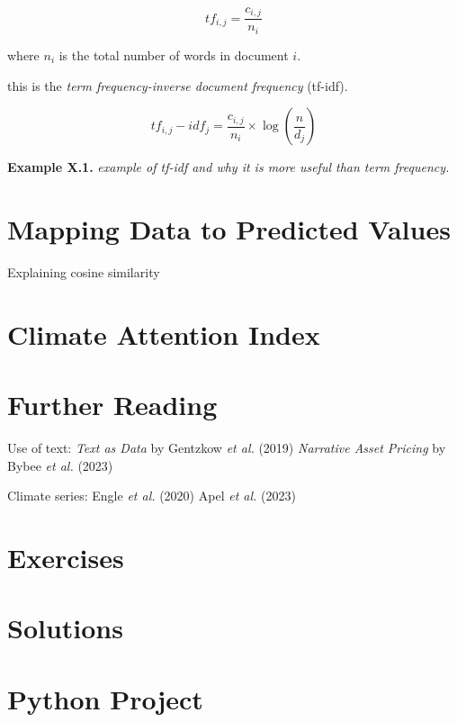 \begin{equation}
tf_{i,j} = \frac{c_{i,j}}{n_i}
\end{equation}

where $n_i$ is the total number of words in document $i$.



this is the \textit{term frequency-inverse document frequency} (tf-idf).

\begin{equation}
tf_{i,j} - idf_{j} = \frac{c_{i,j}}{n_i} \times \log (\frac{n}{d_j})
\end{equation}


\begin{examplebox}
    \textbf{Example X.1.} 
    \textit{example of tf-idf and why it is 
    more useful than term frequency.}
\end{examplebox}

\section{Mapping Data to Predicted Values}

Explaining cosine similarity




\section{Climate Attention Index}


\section{Further Reading}
Use of text:
\textit{Text as Data} by Gentzkow \textit{et al.} (2019) \cite{gentzkow2019text}
\textit{Narrative Asset Pricing} by Bybee \textit{et al.} (2023) \cite{bybee2023narrative}

Climate series:
Engle \textit{et al.} (2020) \cite{engle2020hedging}
Apel \textit{et al.} (2023) \cite{apel2023real}
\section{Exercises}

\section{Solutions}

\section{Python Project}

